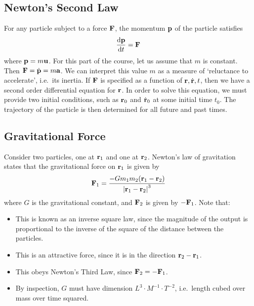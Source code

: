 \subsection{Newton's Second Law}
For any particle subject to a force \(\vb F\), the momentum \(\vb p\) of the particle satisfies
\[
	\frac{\dd \vb p}{\dd{t}} = \vb F
\]
where \(\vb p = m \vb u\).
For this part of the course, let us assume that \(m\) is constant.
Then \(\vb F = \dot{\vb p} = m \vb a\).
We can interpret this value \(m\) as a measure of `reluctance to accelerate', i.e.\ its inertia.
If \(\vb F\) is specified as a function of \(\vb r, \dot{\vb r}, t\), then we have a second order differential equation for \(\vb r\).
In order to solve this equation, we must provide two initial conditions, such as \(\vb r_0\) and \(\dot{\vb r}_0\) at some initial time \(t_0\).
The trajectory of the particle is then determined for all future and past times.

\subsection{Gravitational Force}
Consider two particles, one at \(\vb r_1\) and one at \(\vb r_2\).
Newton's law of gravitation states that the gravitational force on \(\vb r_1\) is given by
\[
	\vb F_1 = \frac{- G m_1 m_2 (\vb r_1 - \vb r_2)}{\abs{\vb r_1 - \vb r_2}^3}
\]
where \(G\) is the gravitational constant, and \(\vb F_2\) is given by \(-\vb F_1\).
Note that:
\begin{itemize}
	\item This is known as an inverse square law, since the magnitude of the output is proportional to the inverse of the square of the distance between the particles.
	\item This is an attractive force, since it is in the direction \(\vb r_2 - \vb r_1\).
	\item This obeys Newton's Third Law, since \(\vb F_2 = - \vb F_1\).
	\item By inspection, \(G\) must have dimension \(L^3 \cdot M^{-1} \cdot T^{-2}\), i.e.\ length cubed over mass over time squared.
\end{itemize}

